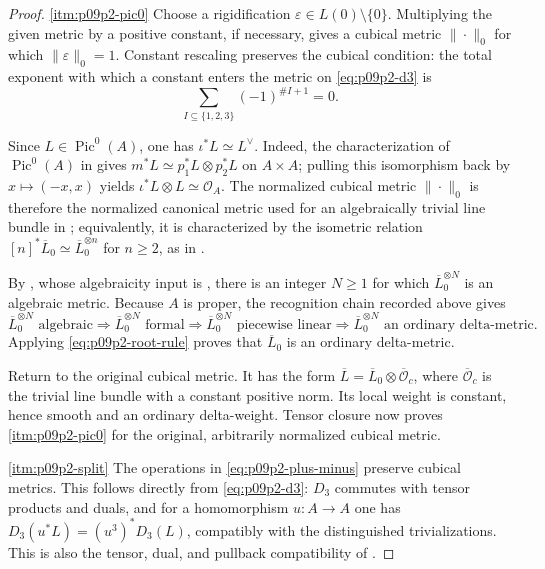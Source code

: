 \begin{proof}
\cref{itm:p09p2-pic0}
Choose a rigidification \(\varepsilon\in L(0)\setminus\{0\}\).  Multiplying
the given metric by a positive constant, if necessary, gives a cubical
metric \(\|\cdot\|_0\) for which \(\|\varepsilon\|_0=1\).  Constant
rescaling preserves the cubical condition: the total exponent with which a
constant enters the metric on \eqref{eq:p09p2-d3} is
\[
        \sum_{I\subseteq\{1,2,3\}}(-1)^{\# I+1}=0.
\]

Since \(L\in\operatorname{Pic}^0(A)\), one has
\(\iota^*L\simeq L^\vee\).  Indeed, the characterization of
\(\operatorname{Pic}^0(A)\) in \cite[Proposition~8.4]{milneAV} gives
\(m^*L\simeq p_1^*L\otimes p_2^*L\) on \(A\times A\); pulling this
isomorphism back by \(x\mapsto(-x,x)\) yields
\(\iota^*L\otimes L\simeq\mathcal O_A\).  The normalized cubical metric
\(\|\cdot\|_0\) is therefore the normalized canonical metric used for an
algebraically trivial line bundle in \cite[Example~8.16]{GK17}; equivalently,
it is characterized by the isometric relation
\([n]^*\overline L_0\simeq\overline L_0^{\otimes n}\) for \(n\geq2\), as in
\cite[Lemmas~19.1.4 and 19.1.6]{CLD25}.

By \cite[Example~8.16]{GK17}, whose algebraicity input is
\cite[Example~3.7]{Gub10CM}, there is an integer \(N\geq1\) for which
\(\overline L_0^{\otimes N}\) is an algebraic metric.  Because \(A\) is
proper, the recognition chain recorded above gives
\[
 \overline L_0^{\otimes N}\text{ algebraic}
 \Longrightarrow
 \overline L_0^{\otimes N}\text{ formal}
 \Longrightarrow
 \overline L_0^{\otimes N}\text{ piecewise linear}
 \Longrightarrow
 \overline L_0^{\otimes N}\text{ an ordinary delta-metric}.
\]
Applying \eqref{eq:p09p2-root-rule} proves that \(\overline L_0\) is an
ordinary delta-metric.

Return to the original cubical metric.  It has the form
\(\overline L=\overline L_0\otimes\overline{\mathcal O}_{c}\), where
\(\overline{\mathcal O}_{c}\) is the trivial line bundle with a constant
positive norm.  Its local weight is constant, hence smooth and an ordinary
delta-weight.  Tensor closure now proves \cref{itm:p09p2-pic0} for the
original, arbitrarily normalized cubical metric.

\cref{itm:p09p2-split}
The operations in \eqref{eq:p09p2-plus-minus} preserve cubical metrics.
This follows directly from \eqref{eq:p09p2-d3}: \(D_3\) commutes with tensor
products and duals, and for a homomorphism \(u:A\to A\) one has
\(D_3(u^*L)=(u^3)^*D_3(L)\), compatibly with the distinguished
trivializations.  This is also the tensor, dual, and pullback compatibility
of \cite[Lemmas~19.1.4 and 19.1.6]{CLD25}.


\end{proof}
